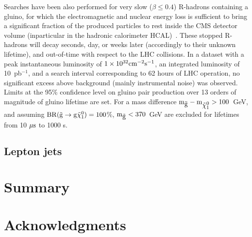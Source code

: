 \documentclass[11pt]{article}
\def\pb{pb$^{-1}$\xspace}
\def\gluino{$\tilde{\rm{g}}$\xspace}
\def\neutralino{$\tilde{\chi}^{0}_{1}$\xspace}
\begin{document}
Searches have been also performed for very slow ($\beta \le 0.4$) R-hadrons containing a gluino, 
for which the electromagnetic and nuclear energy loss is sufficient to bring a significant fraction 
of the produced particles to rest inside the CMS detector volume 
(inparticular in the hadronic calorimeter HCAL)~\cite{}. These stopped R-hadrons will decay seconds, 
day, or weeks later (accordingly to their unknown lifetime), and out-of-time with respect to the LHC collisions. 
In a dataset with a peak instantaneous luminosity of $1\times 10^{32}\rm{cm}^{-2}\rm{s}^{-1}$, 
an integrated luminosity of 10~\pb, and a search interval corresponding to 62 hours of LHC operation, 
no significant excess above background (mainly instrumental noise) was observed.  
Limits at the 95\% confidence level on gluino pair production over 13 orders of magnitude of gluino lifetime 
are set. For a mass difference $\rm{m}_{\mbox{\gluino}} - \rm{m}_{\mbox{\neutralino}} > 100$~GeV, and assuming 
$\rm{BR}( \mbox{\gluino} \rightarrow \rm{g} \mbox{\neutralino} ) = 100$\%, $\rm{m}_{\mbox{\gluino}}<370$~GeV 
are excluded for lifetimes from 10 $\mu\rm{s}$ to 1000 s.

\subsection{Lepton jets}

\section{Summary}\label{sec:summary}


\section*{Acknowledgments}
\end{document}
